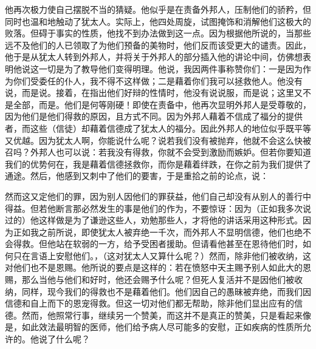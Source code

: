 \par

他再次极力使自己摆脱不当的猜疑。他似乎是在责备外邦人，压制他们的骄矜，但同时也温和地触动了犹太人。实际上，他四处周旋，试图掩饰和消解他们这极大的败落。但碍于事实的性质，他找不到办法做到这一点。因为根据他所说的，当那些远不及他们的人已领取了为他们预备的美物时，他们反而该受更大的谴责。因此，他于是从犹太人转到外邦人，并将关于外邦人的部分插入他的讲论中间，仿佛想表明他说这一切是为了教导他们变得明理。他说，我因两件事称赞你们：一是因为作为你们受委任的仆人，我不得不这样做；二是藉着你们我可以拯救他人。他没有说，而是说。接着，在指出他们好辩的性情时，他没有说说服，而是说；这里又不是全部，而是。他们是何等刚硬！即使在责备中，他再次显明外邦人是受尊敬的，因为他们是他们得救的原因，且方式不同。因为外邦人藉着不信成了福分的提供者，而这些（信徒）却藉着信德成了犹太人的福分。因此外邦人的地位似乎既平等又优越。因为犹太人啊，你能说什么呢？说若我们没有被抛弃，他就不会这么快被召吗？外邦人也可以说：若我没有得救，你就不会受到激励而嫉妒。但若你要知道我们的优势何在，我是藉着信德拯救你，而你是藉着绊跌，在你之前为我们提供了通途。然后，他感到又刺中了他们的要害，于是重拾之前的论点，说：\par

\par

然而这又定他们的罪，因为别人因他们的罪获益，他们自己却没有从别人的善行中得益。但若他断言那必然发生的事是他们的作为，不要惊讶：因为（正如我多次说过的）他这样做是为了谦逊这些人，劝勉那些人，才将他的讲话采用这种形式。因为正如我之前所说，即使犹太人被弃绝一千次，而外邦人不显明信德，他们也绝不会得救。但他站在软弱的一方，给予受困者援助。但请看他甚至在恩待他们时，如何只在言语上安慰他们。，（这对犹太人又算什么呢？）然而，除非他们被收纳，这对他们也不是恩赐。他所说的要点是这样的：若在愤怒中天主赐予别人如此大的恩赐，那么当他与他们和好时，他还会赐予什么呢？但死人复活并不是因他们被收纳，同样，现今我们的得救也不是藉着他们。他们因自己的愚昧被弃绝，而我们因信德和自上而下的恩宠得救。但这一切对他们都无帮助，除非他们显出应有的信德。然而，他照常行事，继续另一个赞美，而这并不是真正的赞美，只是看起来像是，如此效法最明智的医师，他们给予病人尽可能多的安慰，正如疾病的性质所允许的。他说了什么呢？\par

